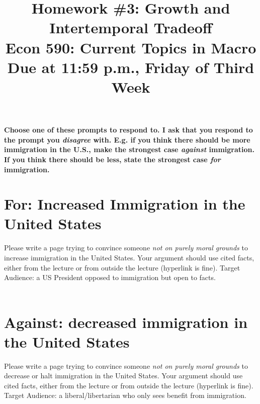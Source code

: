 \documentclass[a4paper]{article}
\title{{\Large \bf Homework \#3: Growth and Intertemporal Tradeoff} \\ \small Econ 590: Current Topics in Macro \\ \small Due at 11:59 p.m., Friday of Third Week}
\date{}
\begin{document}
\maketitle
 
\noindent
\textbf{Choose one of these prompts to respond to.  I ask that you respond to the prompt you \emph{disagree} with.  E.g. if you think there should be more immigration in the U.S., make the strongest case \emph{against} immigration.  If you think there should be less, state the strongest case \emph{for} immigration.  }\\

\section*{For: Increased Immigration in the United States}
Please write a page trying to convince someone \emph{not on purely moral grounds} to increase immigration in the United States.  Your argument should use cited facts, either from the lecture or from outside the lecture (hyperlink is fine).  Target Audience: a US President opposed to immigration but open to facts.\\
\ \\

\section*{Against: decreased immigration in the United States}
Please write a page trying to convince someone \emph{not on purely moral grounds} to decrease or halt immigration in the United States.  Your argument should use cited facts, either from the lecture or from outside the lecture  (hyperlink is fine).  Target Audience: a liberal/libertarian who only sees benefit from immigration.\\
\ \\
\end{document}
